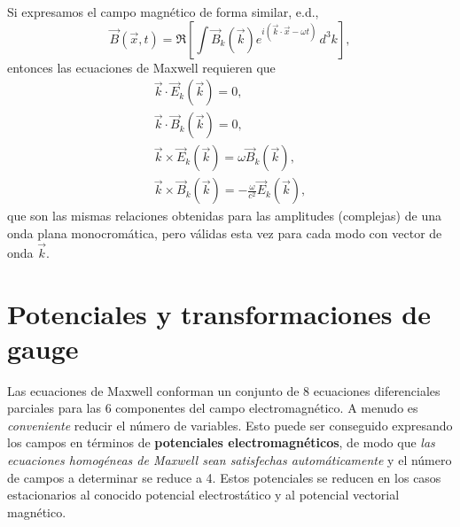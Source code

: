 Si expresamos el campo magnético de forma similar, e.d.,
\begin{equation}
\vec{B}(\vec{x},t) = \Re\left[\int\vec{B}_{k}(\vec{k})e^{i(\vec{k}\cdot\vec{x}-\omega t)}\,d^3k\right],
\end{equation}
entonces las ecuaciones de Maxwell requieren que
\begin{align}
\vec{k}\cdot\vec{E}_k(\vec{k})=0, \\
\vec{k}\cdot\vec{B}_k(\vec{k})=0, \\
\vec{k}\times\vec{E}_k(\vec{k})=\omega\vec{B}_k(\vec{k}) , \\
\vec{k}\times\vec{B}_k(\vec{k})=-\frac{\omega}{c^2}\vec{E}_k(\vec{k}),
\end{align}
que son las mismas relaciones obtenidas para las amplitudes (complejas) de una onda plana monocromática, pero válidas esta vez para cada modo con vector de onda $\vec{k}$.

\section{Potenciales y transformaciones de gauge}

Las ecuaciones de Maxwell conforman un conjunto de 8 ecuaciones diferenciales
parciales para las 6 componentes del campo electromagnético. A menudo es
\textit{conveniente} reducir el número de variables. Esto puede ser conseguido
expresando los campos en términos de \textbf{potenciales electromagnéticos},
de modo que \textit{las ecuaciones homogéneas de Maxwell sean satisfechas
automáticamente} y el número de campos a determinar se reduce a 4. Estos
potenciales se reducen en los casos estacionarios al conocido potencial
electrostático y al potencial vectorial magnético.

